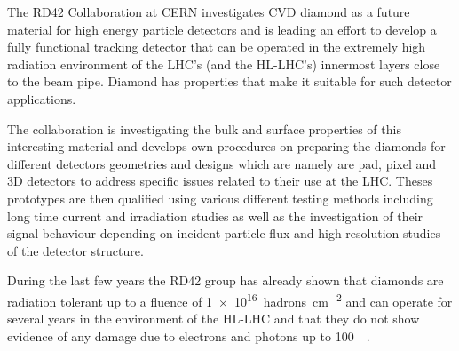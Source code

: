 
The RD42 Collaboration at CERN investigates \ac{CVD} diamond as a future material for high energy particle detectors and is leading an effort to develop a fully functional tracking detector that can be operated in the extremely high radiation environment of the LHC's (and the HL-LHC's) innermost layers close to the beam pipe. Diamond has properties that make it suitable for such detector applications.\par
The collaboration is investigating the bulk and surface properties of this interesting material and develops own procedures on preparing the diamonds for different detectors geometries and designs which are namely are pad, pixel and 3D detectors to address specific issues related to their use at the LHC. Theses prototypes are then qualified using various different testing methods including long time current and irradiation studies as well as the investigation of their signal behaviour depending on incident particle flux and high resolution studies of the detector structure.\par
During the last few years the RD42 group has already shown that diamonds are radiation tolerant up to a fluence of \SI{1e16}{hadrons\per\centi\meter^2} and can operate for several years in the environment of the HL-LHC and that they do not show evidence of any damage due to electrons and photons up to \SI{100}{\mega\rad}.\parend